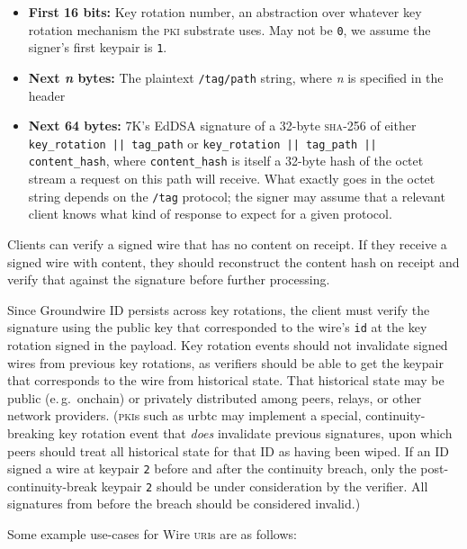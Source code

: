 \documentclass[twoside]{article}
\begin{document}
\begin{itemize}[noitemsep,topsep=2pt]

\item
  \textbf{First 16 bits:} Key rotation number, an abstraction over
  whatever key rotation mechanism the \textsc{pki} substrate uses. May not be
  \texttt{0}, we assume the signer's first keypair is \texttt{1}.
\item
  \textbf{Next \emph{n} bytes:} The plaintext \texttt{/tag/path} string,
  where \emph{n} is specified in the header
\item
  \textbf{Next 64 bytes:} 7K's EdDSA signature of a 32-byte \textsc{sha}-256 of
  either \lstinline[style=inlinecode]{key_rotation || tag_path} or
  \lstinline[style=inlinecode]{key_rotation || tag_path || content_hash},
  where \lstinline[style=inlinecode]{content_hash} is itself a 32-byte hash of the octet
  stream a request on this path will receive. What exactly goes in the
  octet string depends on the \texttt{/tag} protocol; the signer may
  assume that a relevant client knows what kind of response to expect
  for a given protocol.
\end{itemize}

Clients can verify a signed wire that has no content on receipt. If they
receive a signed wire with content, they should reconstruct the content
hash on receipt and verify that against the signature before further
processing.

Since Groundwire ID persists across key rotations, the client must
verify the signature using the public key that corresponded to the
wire's \texttt{id} at the key rotation signed in the payload. Key rotation
events should not invalidate signed wires from previous key rotations,
as verifiers should be able to get the keypair that corresponds to the
wire from historical state. That historical state may be public
(e.\,g.\ onchain) or privately distributed among peers, relays, or other
network providers. (\textsc{pki}s such as urbtc may implement a special,
continuity-breaking key rotation event that \emph{does} invalidate
previous signatures, upon which peers should treat all historical state
for that ID as having been wiped. If an ID signed a wire at keypair
\texttt{2} before and after the continuity breach, only the
post-continuity-break keypair \texttt{2} should be under consideration
by the verifier. All signatures from before the breach should be considered invalid.)

Some example use-cases for Wire \textsc{uri}s are as follows:
\end{document}
